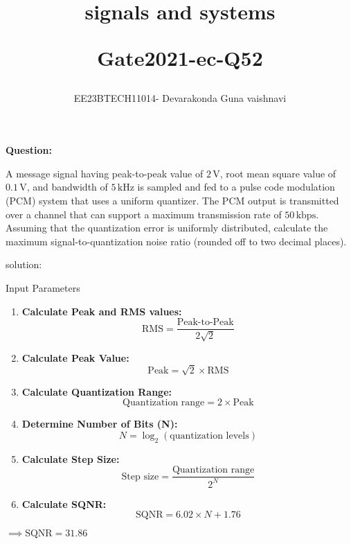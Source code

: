\documentclass[a4,12pt,onecolumn]{IEEEtran}
\begin{document}
\title{ signals and systems
\vspace{1cm}

Gate2021-ec-Q52}
\author{EE23BTECH11014- Devarakonda Guna vaishnavi}
\maketitle
\textbf{Question:}

A message signal having peak-to-peak value of $2 \, \text{V}$, root mean square value of $0.1 \, \text{V}$, and bandwidth of $5 \, \text{kHz}$ is sampled and fed to a pulse code modulation (PCM) system that uses a uniform quantizer. The PCM output is transmitted over a channel that can support a maximum transmission rate of $50 \, \text{kbps}$. Assuming that the quantization error is uniformly distributed, calculate the maximum signal-to-quantization noise ratio (rounded off to two decimal places).

solution:
\begin{table}[h!]
    \centering
    
    \caption{Input Parameters}
    \label{table:parameters}
\end{table}


\begin{enumerate}
    \item \textbf{Calculate Peak and RMS values:}
    \begin{equation}\label{eq:peak_rms}
        \text{RMS} = \frac{\text{Peak-to-Peak}}{2\sqrt{2}}
    \end{equation}

    \item \textbf{Calculate Peak Value:}
    \begin{equation}\label{eq:peak}
        \text{Peak} = \sqrt{2} \times \text{RMS}
    \end{equation}

    \item \textbf{Calculate Quantization Range:}
    \begin{equation}\label{eq:quant_range}
        \text{Quantization range} = 2 \times \text{Peak}
    \end{equation}

    \item \textbf{Determine Number of Bits (N):}
    \begin{equation}\label{eq:num_bits}
        N = \log_2(\text{quantization levels})
    \end{equation}

    \item \textbf{Calculate Step Size:}
    \begin{equation}\label{eq:step_size}
        \text{Step size} = \frac{\text{Quantization range}}{2^N}
    \end{equation}

    \item \textbf{Calculate SQNR:}
    \begin{equation}\label{eq:sqnr}
        \text{SQNR} = 6.02 \times N + 1.76
         \end{equation}
\end{enumerate}




 $\implies \text{SQNR} = 31.86$

 
\end{document}
